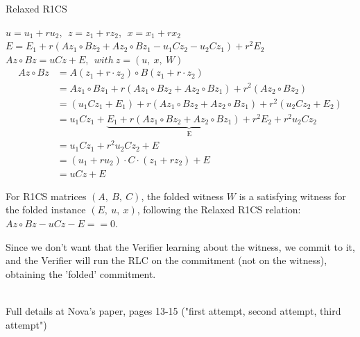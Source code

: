 \documentclass[t]{beamer}
\begin{document}
\begin{frame}{Relaxed R1CS}
  \scriptsize{
	$u=u_1+r u_2,~~ z=z_1+r z_2,~~ x=x_1+r x_2$\\
	$E=E_1 + r (A z_1 \circ B z_2 + A z_2 \circ B z_1 - u_1 C z_2 - u_2 C z_1) + r^2 E_2$\\
   $Az \circ Bz = uCz + E,~~ with~ z=(u,~x,~W)$
\begin{align*}
	Az \circ Bz 
            &= A(z_1 + r \cdot z_2) \circ B(z_1 + r \cdot z_2)\\
            &= A z_1 \circ B z_1 + r(A z_1 \circ B z_2 + A z_2 \circ B z_1) + r^2 (A z_2 \circ B z_2)\\
            &= (u_1 C z_1 + E_1) + r (A z_1 \circ B z_2 + A z_2 \circ B z_1) + r^2 (u_2 C z_2 + E_2)\\
            &= u_1 C z_1 + \underbrace{E_1 + r(A z_1 \circ B z_2 + A z_2 \circ B z_1) + r^2 E_2}_\text{E} + r^2 u_2 C z_2\\
            &= u_1 C z_1 + r^2 u_2 C z_2 + E\\
            &= (u_1 + r u_2) \cdot C \cdot (z_1 + r z_2) + E\\
            &= uCz + E
\end{align*}

For R1CS matrices $(A,~B,~C)$, the folded witness $W$ is a satisfying witness for the folded instance $(E,~u,~x)$, following the Relaxed R1CS relation: $Az \circ Bz - uCz - E ==0$.

Since we don't want that the Verifier learning about the witness, we commit to it, and the Verifier will run the RLC on the commitment (not on the witness), obtaining the 'folded' commitment.

\\\tiny{Full details at Nova's paper, pages 13-15 ("first attempt, second attempt, third attempt")}
}
\end{frame}
\end{document}
